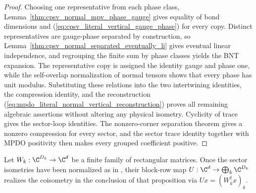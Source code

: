 \begin{proof}\leanok
    Choosing one representative from each phase class,
    Lemma~\ref{thm:cpsv_normal_mpv_phase_gauge} gives equality of bond
    dimensions and (\ref{eq:cpsv_literal_vertical_gauge_phase}) for every copy.
    Distinct representatives are gauge-phase separated by construction, so
    Lemma~\ref{thm:cpsv_normal_separated_eventually_li} gives eventual linear
    independence, and regrouping the finite sum by phase classes yields the BNT
    expansion. The representative copy is assigned the identity gauge and
    phase one, while the self-overlap normalization of normal tensors shows
    that every phase has unit modulus. Substituting these relations into the two intertwining
    identities, the compression identity, and the reconstruction
    (\ref{eq:mpdo_literal_normal_vertical_reconstruction}) proves all remaining
    algebraic assertions without altering any physical isometry. Cyclicity of
    trace gives the sector-loop identities. The nonzero-corner separation
    theorem gives a nonzero compression for every sector, and the sector
    trace identity together with MPDO positivity then makes every grouped coefficient
    positive.
\end{proof}

\begin{definition}
    \label{def:vertical_sector_block_row}
    \leanok
    Let $W_k:\C^{D_k}\to\C^d$ be a finite family of rectangular
    matrices. Once the sector isometries have been normalized as in
    \cite[Proposition~4.13, lines~1863--1870]{Cirac2016MPDO_arXiv}, their
    block-row map $U:\C^d\to\bigoplus_k\C^{D_k}$ realizes the coisometry in the
    conclusion of that proposition via $Ux=(W_k^\dagger x)_k$.
\end{definition}

